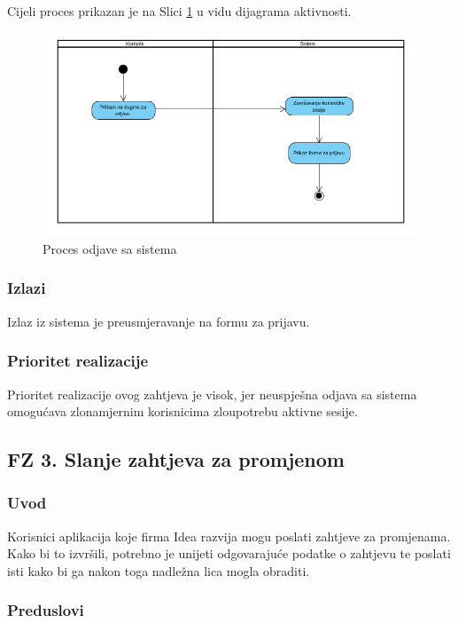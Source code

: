 \documentclass[12pt,a4paper]{article}
\begin{document}
Cijeli proces prikazan je na Slici \ref{act2} u vidu dijagrama aktivnosti.

\begin{figure}[H]
\center
\includegraphics[scale=0.5]{../res/Activity/activity2.JPG}
\caption{Proces odjave sa sistema}
\label{act2}
\end{figure}

\subsubsection{Izlazi}

Izlaz iz sistema je preusmjeravanje na formu za prijavu.

\subsubsection{Prioritet realizacije}

Prioritet realizacije ovog zahtjeva je visok, jer neuspješna odjava sa sistema omogućava zlonamjernim korisnicima zloupotrebu aktivne sesije.

\subsection{FZ 3. Slanje zahtjeva za promjenom}

\subsubsection{Uvod}

Korisnici aplikacija koje firma Idea razvija mogu poslati zahtjeve za promjenama. Kako bi to izvršili, potrebno je unijeti odgovarajuće podatke o zahtjevu te poslati isti kako bi ga nakon toga nadležna lica mogla obraditi.

\subsubsection{Preduslovi}
\end{document}
